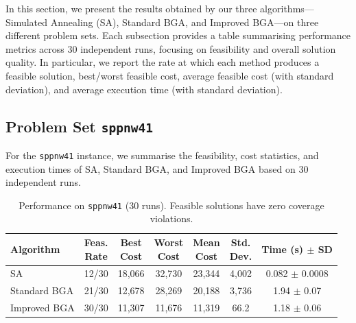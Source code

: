 \documentclass[12pt]{article}
\begin{document}
In this section, we present the results obtained by our three algorithms---Simulated Annealing (SA), Standard BGA, and Improved BGA---on three different problem sets. Each subsection provides a table summarising performance metrics across 30 independent runs, focusing on feasibility and overall solution quality. In particular, we report the rate at which each method produces a feasible solution, best/worst feasible cost, average feasible cost (with standard deviation), and average execution time (with standard deviation).

\subsection{Problem Set \texttt{sppnw41}}
\label{subsec:sppnw41}

For the \texttt{sppnw41} instance, we summarise the feasibility, cost statistics, and execution times of SA, Standard BGA, and Improved BGA based on 30 independent runs.

\vspace{1em}

\begin{table}[htbp]
  \centering
  \label{tab:sppnw41}
  \renewcommand{\arraystretch}{1.1}
  \begin{tabular}{lcccccc}
    \hline
    \textbf{Algorithm} & \makecell{Feas.\\Rate} & \makecell{Best\\Cost} & \makecell{Worst\\Cost} & \makecell{Mean\\Cost} & \makecell{Std.\\Dev.} & \makecell{Time\\(s) $\pm$ SD}\\
    \hline
    SA            
      & 12/30 
      & 18,066
      & 32,730 
      & 23,344
      & 4,002 
      & 0.082 $\pm$ 0.0008 \\
    Standard BGA 
      & 21/30 
      & 12,678 
      & 28,269 
      & 20,188 
      & 3,736 
      & 1.94 $\pm$ 0.07 \\
    Improved BGA 
      & 30/30 
      & 11,307 
      & 11,676
      & 11,319 
      & 66.2
      & 1.18 $\pm$ 0.06 \\
    \hline
  \end{tabular}
  \caption{Performance on \texttt{sppnw41} (30 runs). Feasible solutions have zero coverage violations.}
\end{table}
\end{document}
